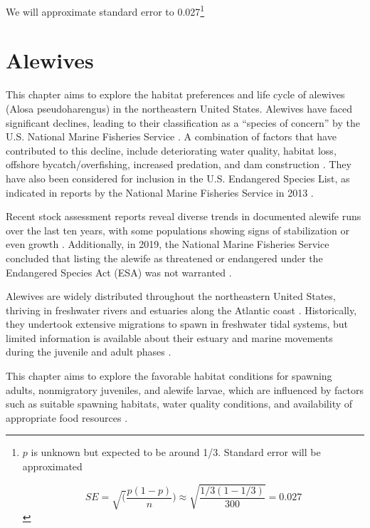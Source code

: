 \documentclass[
]{book}
\begin{document}
We will approximate standard error to 0.027\footnote{\(p\) is unknown but expected to be around 1/3. Standard error will be approximated

  \[
  SE = \sqrt(\frac{p(1-p)}{n}) \approx \sqrt{\frac{1/3 (1 - 1/3)} {300}} = 0.027
  \]}

\hypertarget{alewives}{%
\chapter{Alewives}\label{alewives}}

This chapter aims to explore the habitat preferences and life cycle of alewives (Alosa pseudoharengus) in the northeastern United States. Alewives have faced significant declines, leading to their classification as a ``species of concern'' by the U.S. National Marine Fisheries Service \citep{nmfs_national_marine_fisheries_service_species_2009}. A combination of factors that have contributed to this decline, include deteriorating water quality, habitat loss, offshore bycatch/overfishing, increased predation, and dam construction \citep{kocovsky_linking_2008, nmfs_national_marine_fisheries_service_species_2009, bethoney_environmental_2014}. They have also been considered for inclusion in the U.S. Endangered Species List, as indicated in reports by the National Marine Fisheries Service in 2013 \citep{nmfs_national_marine_fisheries_service_endangered_2013}.

Recent stock assessment reports reveal diverse trends in documented alewife runs over the last ten years, with some populations showing signs of stabilization or even growth \citep{asmfc_river_2017}. Additionally, in 2019, the National Marine Fisheries Service concluded that listing the alewife as threatened or endangered under the Endangered Species Act (ESA) was not warranted \citep{nmfs_national_marine_fisheries_service_not_2019}.

Alewives are widely distributed throughout the northeastern United States, thriving in freshwater rivers and estuaries along the Atlantic coast \citep{asmfc_fishery_1985}. Historically, they undertook extensive migrations to spawn in freshwater tidal systems, but limited information is available about their estuary and marine movements during the juvenile and adult phases \citep{mccartin_new_2019}.

This chapter aims to explore the favorable habitat conditions for spawning adults, nonmigratory juveniles, and alewife larvae, which are influenced by factors such as suitable spawning habitats, water quality conditions, and availability of appropriate food resources \citep{lynch_projected_2015}.
\end{document}
